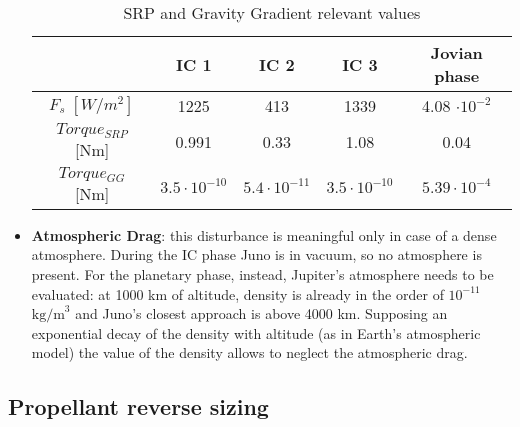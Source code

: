 \begin{itemize}
    \begin{table}[H]
        \renewcommand{\arraystretch}{1.3}
        \centering
        \small
        \begin{tabular}{|c|c|c|c|c|}
            \hline
            &\textbf{IC 1} & \textbf{IC 2} & \textbf{IC 3} & \textbf{Jovian phase} \\
            \hline
            \hline
            $F_{s} \; [W/m^2]$ & 1225 & 413 & 1339 & 4.08 $\cdot 10^{-2}$ \\
            \hline
            $Torque_{SRP}$ [Nm] & 0.991 & 0.33 & 1.08 & 0.04 \\
            \hline
             $Torque_{GG}$ [Nm] & $3.5 \cdot 10^{-10}$ & $5.4 \cdot 10^{-11}$ & $3.5 \cdot 10^{-10}$ & $5.39 \cdot 10^{-4}$ \\
            \hline
        \end{tabular}
        \caption{SRP and Gravity Gradient relevant values}
        \label{table:SRP_GGG}
    \end{table}
    \vspace*{-3mm}
    
    \item \textbf{Atmospheric Drag}: this disturbance is meaningful only in case of a dense atmosphere. During the IC phase Juno is in vacuum, so no atmosphere is present. For the planetary phase, instead, Jupiter's atmosphere needs to be evaluated: at 1000 km of altitude, density is already in the order of $10^{-11}$ $\textrm{kg/m}^3$ and Juno's closest approach is above 4000 km. Supposing an exponential decay of the density with altitude (as in Earth's atmospheric model) the value of the density allows to neglect the atmospheric drag\cite{jupiter_density}.
    
        
\end{itemize}

\subsection{Propellant reverse sizing}
\label{subsec:prop_rev_sizing}

